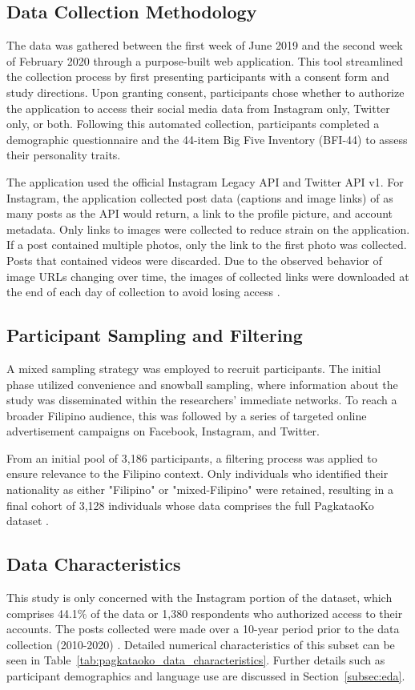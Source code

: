 \subsection{Data Collection Methodology}
The data was gathered between the first week of June 2019 and the second week of February 2020 through a purpose-built web application. This tool streamlined the collection process by first presenting participants with a consent form and study directions. Upon granting consent, participants chose whether to authorize the application to access their social media data from Instagram only, Twitter only, or both. Following this automated collection, participants completed a demographic questionnaire and the 44-item Big Five Inventory (BFI-44) to assess their personality traits.

The application used the official Instagram Legacy API and Twitter API v1. For Instagram, the application collected post data (captions and image links) of as many posts as the API would return, a link to the profile picture, and account metadata. Only links to images were collected to reduce strain on the application. If a post contained multiple photos, only the link to the first photo was collected. Posts that contained videos were discarded. Due to the observed behavior of image URLs changing over time, the images of collected links were downloaded at the end of each day of collection to avoid losing access \citep{tighe_acorda_2022}. 

\subsection{Participant Sampling and Filtering}
A mixed sampling strategy was employed to recruit participants. The initial phase utilized convenience and snowball sampling, where information about the study was disseminated within the researchers' immediate networks. To reach a broader Filipino audience, this was followed by a series of targeted online advertisement campaigns on Facebook, Instagram, and Twitter.

From an initial pool of 3,186 participants, a filtering process was applied to ensure relevance to the Filipino context. Only individuals who identified their nationality as either "Filipino" or "mixed-Filipino" were retained, resulting in a final cohort of 3,128 individuals whose data comprises the full PagkataoKo dataset \citep{tighe_acorda_2022}.


\subsection{Data Characteristics}
This study is only concerned with the Instagram portion of the dataset, which comprises 44.1\% of the data or 1,380 respondents who authorized access to their accounts. The posts collected were made over a 10-year period prior to the data collection (2010-2020) \citep{tighe_acorda_2022}. Detailed numerical characteristics of this subset can be seen in Table~\ref{tab:pagkataoko_data_characteristics}. Further details such as participant demographics and language use are discussed in Section~\ref{subsec:eda}.


